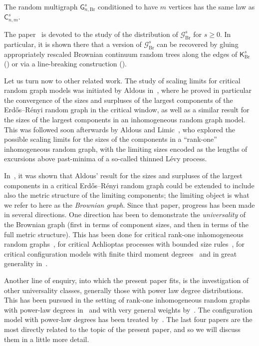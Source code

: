 \documentclass[10pt]{amsart}
\theoremstyle{definition}\newtheorem{defi}[theo]{Definition}\newtheorem{rema}[theo]{Remark}\newtheorem{exam}[theo]{Example}\newtheorem{exem}[theo]{Example}\newtheorem{nota}[theo]{Notation}
\newcommand{\Br}{\mathrm{Br}}
\newcommand{\cG}{\mathcal{G}}
\newcommand{\sG}{\mathsf{G}}
\newcommand{\sK}{\mathsf{K}}
\newcommand{\sC}{\mathsf{C}}
\begin{document}

\begin{coro}
The random multigraph $\sG_{n,\Br}^s$ conditioned to have $m$ vertices has the same law as $\sC_{n,m}^s$.
\end{coro}

The paper~\cite{ABBrGo} is devoted to the study of the distribution of $\cG_{\Br}^s$ for $s \ge 0$. In particular, it is shown there that a version of $\cG_{\Br}^s$ can be recovered by gluing appropriately rescaled Brownian continuum random trees along the edges of $\sK_{\Br}^s$ (\cite[Procedure~1]{ABBrGo}) or via a line-breaking construction (\cite[Procedure~2 $\&$ Theorem~4]{ABBrGo}).

Let us turn now to other related work. The study of scaling limits for critical random graph models was initiated by Aldous in~\cite{AldousCritRG}, where he proved in particular the convergence of the sizes and surpluses of the largest components of the Erd\H{o}s--Rényi random graph in the critical window, as well as a similar result for the sizes of the largest components in an inhomogeneous random graph model. This was followed soon afterwards by Aldous and Limic~\cite{AldousLimic}, who explored the possible scaling limits for the sizes of the components in a ``rank-one'' inhomogeneous random graph, with the limiting sizes encoded as the lengths of excursions above past-minima of a so-called thinned Lévy process.

In~\cite{ABBrGo12}, it was shown that Aldous' result for the sizes and surpluses of the largest components in a critical Erd\H{o}s--Rényi random graph could be extended to include also the metric structure of the limiting components; the limiting object is what we refer to here as the \emph{Brownian graph}. Since that paper, progress has been made in several directions. One direction has been to demonstrate the \emph{universality} of the Brownian graph (first in terms of component sizes, and then in terms of the full metric structure). This has been done for critical rank-one inhomogeneous random graphs~\cite{BhamidiSenWang17,BhvdHvL3rdMo,Turova}, for critical Achlioptas processes with bounded size rules~\cite{AugMultCoal}, for critical configuration models with finite third moment degrees~\cite{BS16+,DhvdHvLS17,Joseph14, NachmiasPeres,Riordan12} and in great generality in~\cite{BBSW14+}.

Another line of enquiry, into which the present paper fits, is the investigation of other universality classes, generally those with power law degree distributions. This has been pursued in the setting of rank-one inhomogeneous random graphs with power-law degrees in~\cite{BhvdHvLNovel,BhvdHSen18,vdH13} and with very general weights by~\cite{BrDuWa18,BrDuWa20}. The configuration model with power-law degrees has been treated by~\cite{BhDhvdHSen2020,BDvdHS17,DvdHvLS16,Joseph14}. The last four papers are the most directly related to the topic of the present paper, and so we will discuss them in a little more detail.
\end{document}
